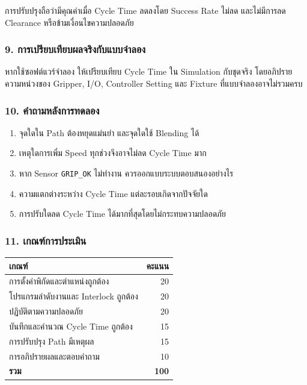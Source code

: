 การปรับปรุงถือว่ามีคุณค่าเมื่อ Cycle Time ลดลงโดย Success Rate ไม่ลด และไม่มีการลด Clearance หรือข้ามเงื่อนไขความปลอดภัย

\subsubsection{9. การเปรียบเทียบผลจริงกับแบบจำลอง}

หากใช้ซอฟต์แวร์จำลอง ให้เปรียบเทียบ Cycle Time ใน Simulation กับชุดจริง โดยอภิปรายความหน่วงของ Gripper, I/O, Controller Setting และ Fixture ที่แบบจำลองอาจไม่รวมครบ

\subsubsection{10. คำถามหลังการทดลอง}

\begin{enumerate}
    \item จุดใดใน Path ต้องหยุดแม่นยำ และจุดใดใช้ Blending ได้
    \item เหตุใดการเพิ่ม Speed ทุกช่วงจึงอาจไม่ลด Cycle Time มาก
    \item หาก Sensor \texttt{GRIP\_OK} ไม่ทำงาน ควรออกแบบระบบตอบสนองอย่างไร
    \item ความแตกต่างระหว่าง Cycle Time แต่ละรอบเกิดจากปัจจัยใด
    \item การปรับใดลด Cycle Time ได้มากที่สุดโดยไม่กระทบความปลอดภัย
\end{enumerate}

\subsubsection{11. เกณฑ์การประเมิน}

\begin{table}[htbp]
    \centering
    \begin{tabular}{l r}
        \hline
        \textbf{เกณฑ์} & \textbf{คะแนน} \\
        \hline
        การตั้งค่าพิกัดและตำแหน่งถูกต้อง & 20 \\
        โปรแกรมลำดับงานและ Interlock ถูกต้อง & 20 \\
        ปฏิบัติตามความปลอดภัย & 20 \\
        บันทึกและคำนวณ Cycle Time ถูกต้อง & 15 \\
        การปรับปรุง Path มีเหตุผล & 15 \\
        การอภิปรายผลและตอบคำถาม & 10 \\
        \textbf{รวม} & \textbf{100} \\
        \hline
    \end{tabular}
\end{table}



